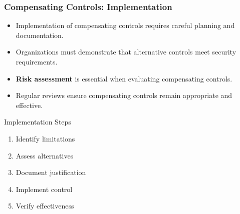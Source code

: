 \documentclass{beamer}
\begin{document}
\begin{frame}
    \frametitle{Compensating Controls: Implementation}
    
    \begin{itemize}
        \item Implementation of compensating controls requires careful planning and documentation.
        
        \item Organizations must demonstrate that alternative controls meet security requirements.
        
        \item \textbf{Risk assessment} is essential when evaluating compensating controls.
        
        \item Regular reviews ensure compensating controls remain appropriate and effective.
    \end{itemize}
    
    \begin{block}{Implementation Steps}
        \begin{enumerate}
            \item Identify limitations
            \item Assess alternatives
            \item Document justification
            \item Implement control
            \item Verify effectiveness
        \end{enumerate}
    \end{block}
\end{frame}
\end{document}
